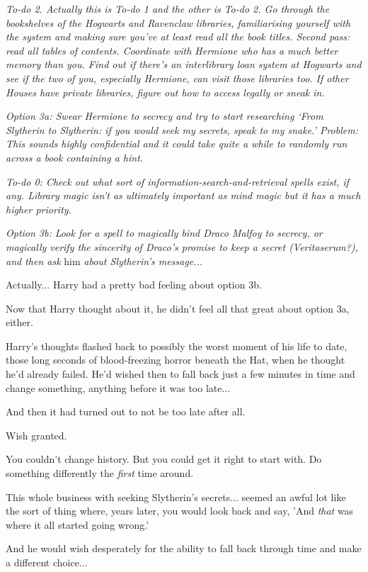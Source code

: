 \emph{To-do 2. Actually this is To-do 1 and the other is To-do 2. Go
through the bookshelves of the Hogwarts and Ravenclaw libraries,
familiarising yourself with the system and making sure you've at least
read all the book titles. Second pass: read all tables of contents.
Coordinate with Hermione who has a much better memory than you. Find out
if there's an interlibrary loan system at Hogwarts and see if the two of
you, especially Hermione, can visit those libraries too. If other Houses
have private libraries, figure out how to access legally or sneak in.}

\emph{Option 3a: Swear Hermione to secrecy and try to start researching
`From Slytherin to Slytherin: if you would seek my secrets, speak to my
snake.' Problem: This sounds highly confidential and it could take quite
a while to randomly run across a book containing a hint.}

\emph{To-do 0: Check out what sort of information-search-and-retrieval
spells exist, if any. Library magic isn't as ultimately important as
mind magic but it has a much higher priority.}

\emph{Option 3b: Look for a spell to magically bind Draco Malfoy to
secrecy, or magically verify the sincerity of Draco's promise to keep a
secret (Veritaserum?), and then ask} him \emph{about Slytherin's
message...}

Actually... Harry had a pretty bad feeling about option 3b.

Now that Harry thought about it, he didn't feel all that great about
option 3a, either.

Harry's thoughts flashed back to possibly the worst moment of his life
to date, those long seconds of blood-freezing horror beneath the Hat,
when he thought he'd already failed. He'd wished then to fall back just
a few minutes in time and change something, anything before it was too
late...

And then it had turned out to not be too late after all.

Wish granted.

You couldn't change history. But you could get it right to start with.
Do something differently the \emph{first} time around.

This whole business with seeking Slytherin's secrets... seemed an
awful lot like the sort of thing where, years later, you would look back
and say, 'And \emph{that} was where it all started going wrong.'

And he would wish desperately for the ability to fall back through time
and make a different choice...

